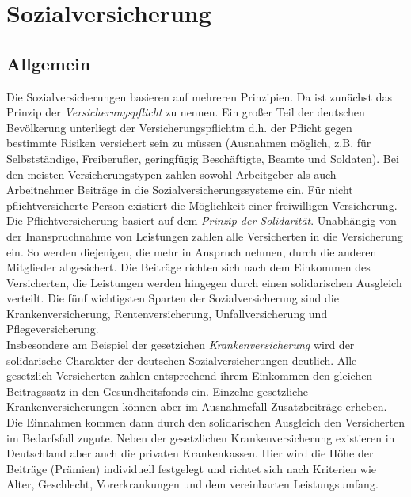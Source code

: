 \documentclass[a4paper, 12pt]{report}
\begin{document}
\newpage
\section{Sozialversicherung}

\subsection{Allgemein}

Die Sozialversicherungen basieren auf mehreren Prinzipien. Da ist zunächst das 
Prinzip der \emph{Versicherungspflicht} zu nennen. Ein großer Teil der deutschen
Bevölkerung unterliegt der Versicherungspflichtm d.h. der Pflicht gegen 
bestimmte Risiken versichert sein zu müssen (Ausnahmen möglich, z.B. für 
Selbstständige, Freiberufler, geringfügig Beschäftigte, Beamte und Soldaten). 
Bei den meisten Versicherungstypen zahlen sowohl Arbeitgeber als auch 
Arbeitnehmer Beiträge in die Sozialversicherungssysteme ein. Für nicht 
pflichtversicherte Person existiert die Möglichkeit einer freiwilligen 
Versicherung. \\

Die Pflichtversicherung basiert auf dem \emph{Prinzip der Solidarität}. 
Unabhängig von der Inanspruchnahme von Leistungen zahlen alle Versicherten in 
die Versicherung ein. So werden diejenigen, die mehr in Anspruch nehmen, durch 
die anderen Mitglieder abgesichert. Die Beiträge richten sich nach dem Einkommen
des Versicherten, die Leistungen werden hingegen durch einen solidarischen 
Ausgleich verteilt. Die fünf wichtigsten Sparten der Sozialversicherung sind die
Krankenversicherung, Rentenversicherung, Unfallversicherung und 
Pflegeversicherung. \\

Insbesondere am Beispiel der gesetzichen \emph{Krankenversicherung} wird der 
solidarische Charakter der deutschen Sozialversicherungen deutlich. Alle 
gesetzlich Versicherten zahlen entsprechend ihrem Einkommen den gleichen 
Beitragssatz in den Gesundheitsfonds ein. Einzelne gesetzliche 
Krankenversicherungen können aber im Ausnahmefall Zusatzbeiträge erheben. Die 
Einnahmen kommen dann durch den solidarischen Ausgleich den Versicherten im 
Bedarfsfall zugute. Neben der gesetzlichen Krankenversicherung existieren in 
Deutschland aber auch die privaten Krankenkassen. Hier wird die Höhe der 
Beiträge (Prämien) individuell festgelegt und richtet sich nach Kriterien wie 
Alter, Geschlecht, Vorerkrankungen und dem vereinbarten Leistungsumfang. \\
\end{document}
